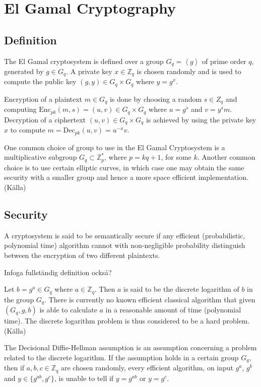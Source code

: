 \section{El Gamal Cryptography}

\subsection{Definition}
The El Gamal cryptosystem is defined over a group $G_q =
\left<g\right>$ of prime order $q$, generated by $g \in G_q$. A
private key $x \in \mathbb{Z}_q$ is chosen randomly and is used to
compute the public key $(g,y) \in G_q \times G_q$ where $y =
g^x$. 

Encryption of a plaintext $m \in G_q$ is done by choosing a random $s
\in Z_q$ and computing $ \mathrm{Enc}_{pk}(m,s) = (u,v) \in G_q \times
G_q$ where $u = g^s$ and $v = y^sm$. Decryption of a ciphertext $(u,v)
\in G_q \times G_q$ is achieved by using the private key $x$ to
compute $m = \mathrm{Dec}_{pk}(u,v) = u^{-x}v$.

One common choice of group to use in the El Gamal Cryptosystem is a
multiplicative subgroup $G_q \subset \mathbb{Z}_p^*$, where $p = kq +
1$, for some $k$. Another common choice is to use certain elliptic
curves, in which case one may obtain the same security with a smaller
group and hence a more space efficient implementation. (Källa)

\subsection{Security}
A cryptosystem is said to be semantically secure if any efficient
(probabilistic, polynomial time) algorithm cannot with non-negligible
probability distinguish between the encryption of two different
plaintexts.

Infoga fullständig definition också?

Let $b = g^a \in G_q$ where $a \in \mathbb{Z}_q$. Then $a$ is said to
be the discrete logarithm of $b$ in the group $G_q$. There is
currently no known efficient classical algorithm that given $(G_q, g,
b)$ is able to calculate $a$ in a reasonable amount of time
(polynomial time). The discrete logarithm problem is thus considered
to be a hard problem. (Källa)

The Decisional Diffie-Hellman assumption is an assumption concerning a
problem related to the discrete logarithm. If the assumption holds in
a certain group $G_q$, then if $a,b,c \in \mathbb{Z}_q$ are chosen
randomly, every efficient algorithm, on input $g^a$, $g^b$ and $y \in
\{g^{ab}, g^c\}$, is unable to tell if $y = g^{ab}$ or $y = g^c$.

